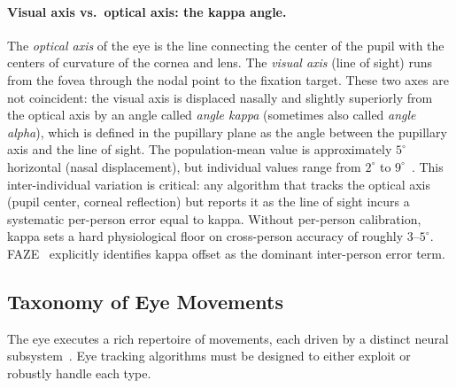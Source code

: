 \documentclass[11pt,a4paper]{article}
\begin{document}
\paragraph{Visual axis vs.\ optical axis: the kappa angle.}
The \textit{optical axis} of the eye is the line connecting the center of the pupil with the centers of curvature of the cornea and lens.
The \textit{visual axis} (line of sight) runs from the fovea through the nodal point to the fixation target.
These two axes are not coincident: the visual axis is displaced nasally and slightly superiorly from the optical axis by an angle called \textit{angle kappa} (sometimes also called \textit{angle alpha}), which is defined in the pupillary plane as the angle between the pupillary axis and the line of sight.
The population-mean value is approximately $5^\circ$ horizontal (nasal displacement), but individual values range from $2^\circ$ to $9^\circ$~\cite{basmak2007measurement,tabernero2019individual}.
This inter-individual variation is critical: any algorithm that tracks the optical axis (pupil center, corneal reflection) but reports it as the line of sight incurs a systematic per-person error equal to kappa.
Without per-person calibration, kappa sets a hard physiological floor on cross-person accuracy of roughly $3$--$5^\circ$.
FAZE~\cite{park2019faze} explicitly identifies kappa offset as the dominant inter-person error term.

\subsection{Taxonomy of Eye Movements}

The eye executes a rich repertoire of movements, each driven by a distinct neural subsystem~\cite{leigh2015neurology}.
Eye tracking algorithms must be designed to either exploit or robustly handle each type.
\end{document}
